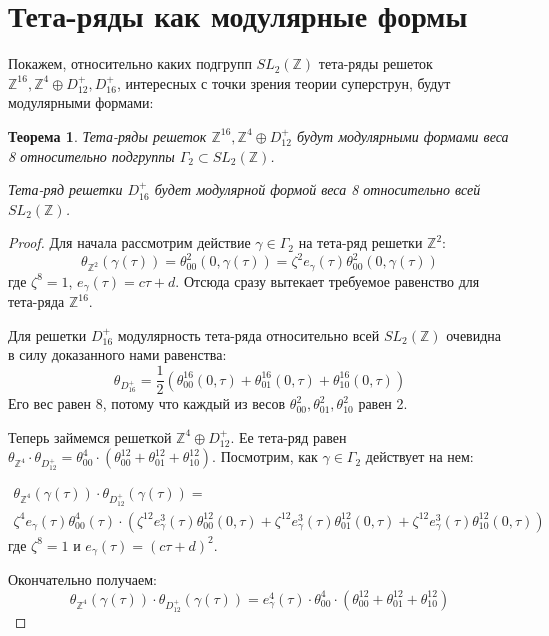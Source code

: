 \documentclass{article}
\newcommand{\ZZ}{\mathbb{Z}}
\theoremstyle{break}
\newtheorem{theorem}{Теорема}[section]
\begin{document}
\section{Тета-ряды как модулярные формы}

Покажем, относительно каких подгрупп $SL_2(\ZZ)$ тета-ряды решеток $\ZZ^{16}, \ZZ^4 \oplus D_{12}^+, D_{16}^+$, интересных с точки зрения теории суперструн, будут модулярными формами:


\begin{theorem}
	Тета-ряды решеток $\ZZ^{16},  \ZZ^4 \oplus D_{12}^+$ будут модулярными формами
	веса 8 относительно подгруппы $\Gamma_2 \subset SL_2(\ZZ)$.
	
	Тета-ряд решетки $D_{16}^+$ будет модулярной формой веса 8 относительно всей $SL_2(\ZZ)$.
\end{theorem}

\begin{proof}
	Для начала рассмотрим действие $\gamma \in \Gamma_2$ на тета-ряд решетки $\ZZ^{2}$:
	\begin{equation}
		\theta_{\ZZ^2}(\gamma(\tau))=\theta_{00}^2(0, \gamma(\tau)) = \zeta^2 e_{\gamma}(\tau) \theta^2_{00}(0, \gamma(\tau))
	\end{equation}
	где $\zeta^8=1$, $e_\gamma(\tau)=c \tau + d$. Отсюда сразу вытекает требуемое равенство для тета-ряда $\ZZ^{16}$.
	
	Для решетки $D_{16}^+$ модулярность тета-ряда относительно всей $SL_2(\ZZ)$ очевидна в силу доказанного нами равенства:
	\begin{equation}\theta_{D_{16}^+}=\frac{1}{2}(\theta_{00}^{16}(0, \tau) + \theta_{01}^{16}(0, \tau) + \theta_{10}^{16}(0, \tau))\end{equation}
	Его вес равен 8, потому что каждый из весов 
	$\theta_{00}^2, \theta_{01}^2, \theta_{10}^2$ равен 2.
	
	Теперь займемся решеткой $\ZZ^4 \oplus D_{12}^+$. Ее тета-ряд равен $\theta_{\ZZ^4} \cdot \theta_{D_{12}^+} = \theta_{00}^4 \cdot (\theta_{00}^{12} + \theta_{01}^{12} + \theta_{10}^{12})$. Посмотрим, как $\gamma \in \Gamma_2$ действует на нем:

\begin{align}
		\theta_{\ZZ^4}(\gamma(\tau)) \cdot \theta_{D_{12}^+}(\gamma(\tau)) = \\	 \nonumber	
		\zeta^4 e_{\gamma}(\tau)\theta_{00}^4 (\tau) \cdot
		(
			\zeta^{12} e_{\gamma}^3(\tau)\theta_{00}^{12} (0, \tau)
			+ \zeta^{12} e_{\gamma}^3(\tau)\theta_{01}^{12} (0, \tau)
			+ \zeta^{12} e_{\gamma}^3(\tau)\theta_{10}^{12} (0, \tau)
		)
\end{align}
	где $\zeta^8=1$ и $e_\gamma(\tau) = (c\tau + d)^2$.
	
	Окончательно получаем:
	\begin{equation}
		\theta_{\ZZ^4}(\gamma(\tau)) \cdot \theta_{D_{12}^+}(\gamma(\tau))
		=
		e_{\gamma}^4(\tau)\cdot \theta_{00}^4 \cdot (\theta_{00}^{12} + \theta_{01}^{12} + \theta_{10}^{12})
	\end{equation}
	
\end{proof}
\end{document}
